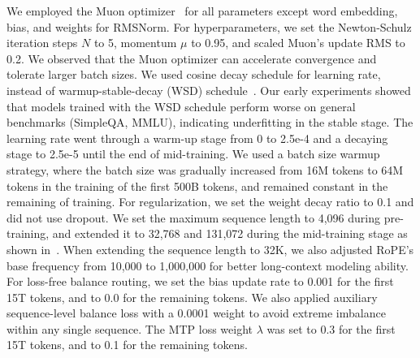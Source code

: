We employed the Muon optimizer~\cite{jordan6muon,liu2025muon} for all parameters except word embedding, bias, and weights for RMSNorm. For hyperparameters, we set the Newton-Schulz iteration steps $N$ to 5, momentum $\mu$ to 0.95, and scaled Muon's update RMS to 0.2. We observed that the Muon optimizer can accelerate convergence and tolerate larger batch sizes. We used cosine decay schedule for learning rate, instead of warmup-stable-decay (WSD) schedule~\cite{huminicpm}. Our early experiments showed that models trained with the WSD schedule perform worse on general benchmarks (SimpleQA, MMLU), indicating underfitting in the stable stage. The learning rate went through a warm-up stage from 0 to 2.5e-4 and a decaying stage to 2.5e-5 until the end of mid-training. We used a batch size warmup strategy, where the batch size was gradually increased from 16M tokens to 64M tokens in the training of the first 500B tokens, and remained constant in the remaining of training. 
For regularization, we set the weight decay ratio to 0.1 and did not use dropout. We set the maximum sequence length to 4,096 during pre-training, and extended it to 32,768 and 131,072 during the mid-training stage as shown in~. When extending the sequence length to 32K, we also adjusted RoPE's base frequency from 10,000 to 1,000,000 for better long-context modeling ability. For loss-free balance routing, we set the bias update rate to 0.001 for the first 15T tokens, and to 0.0 for the remaining tokens. We also applied auxiliary sequence-level balance loss with a 0.0001 weight to avoid extreme imbalance within any single sequence. The MTP loss weight $\lambda$ was set to 0.3 for the first 15T tokens, and to 0.1 for the remaining tokens.
